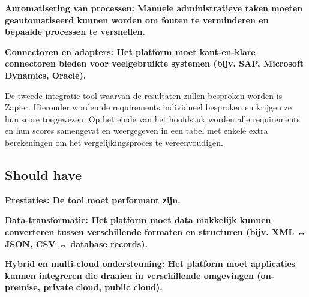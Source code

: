 \vspace{\baselineskip}



\vspace{\baselineskip}

\textbf{Automatisering van processen: Manuele administratieve taken moeten geautomatiseerd kunnen worden om fouten te verminderen en bepaalde processen te versnellen.}

\vspace{\baselineskip}



\vspace{\baselineskip}

\textbf{Connectoren en adapters: Het platform moet kant-en-klare connectoren bieden voor veelgebruikte systemen (bijv. SAP, Microsoft Dynamics, Oracle).}

\vspace{\baselineskip}

De tweede integratie tool waarvan de resultaten zullen besproken worden is Zapier. Hieronder worden de requirements individueel besproken en krijgen ze hun score toegewezen. Op het einde van het hoofdstuk worden alle requirements en hun scores samengevat en weergegeven in een tabel met enkele extra berekeningen om het vergelijkingsproces te vereenvoudigen.

\subsection{Should have}%
\label{ShouldHaveZapier}

\textbf{Prestaties: De tool moet performant zijn.}

\vspace{\baselineskip}



\vspace{\baselineskip}

\textbf{Data-transformatie: Het platform moet data makkelijk kunnen converteren tussen verschillende formaten en structuren (bijv. XML ↔ JSON, CSV ↔ database records).}

\vspace{\baselineskip}



\vspace{\baselineskip}

\textbf{Hybrid en multi-cloud ondersteuning: Het platform moet applicaties kunnen integreren die draaien in verschillende omgevingen (on-premise, private cloud, public cloud).}

